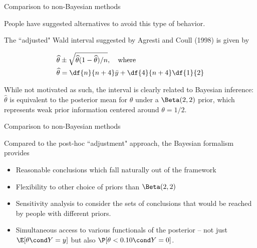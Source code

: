 \documentclass[10pt]{beamer}
\begin{document}
\begin{frame}{Comparison to non-Bayesian methods}

People have suggested alternatives to avoid this type of behavior.  \pause 

The ``adjusted" Wald interval suggested by Agresti and Coull (1998) is given by

\begin{align*}
\widehat{\theta} & \pm \sqrt{\widehat{\theta} (1 - \widehat{\theta}) / n},  \quad \text{where} \\
\widehat{\theta}  &= \df{n}{n+4} \bar{y} + \df{4}{n+4} \df{1}{2}
\end{align*}

\pause 
While not motivated as such,  the interval is clearly related to Bayesian inference:  $\widehat{\theta}$ is equivalent to the posterior mean for $\theta$ under a $\Beta(2,2)$ prior,  which represents weak prior information centered around $\theta = 1/2$.

\end{frame}

\begin{frame}{Comparison to non-Bayesian methods}

Compared to the post-hoc ``adjustment" approach,  the Bayesian formalism provides

\begin{itemize}
\item Reasonable conclusions which fall naturally out of the framework
\item Flexibility to other choice of priors than $\Beta(2,2)$
\item Sensitivity analysis to consider the sets of conclusions that would be reached by people with different priors. 
\item Simultaneous access to various functionals of the posterior -- not just $\E[\theta \cond Y= y]$ but also $\P [\theta < 0.10 \cond Y=0]$.
\end{itemize}

\end{frame}
\end{document}
